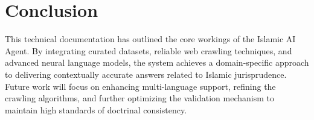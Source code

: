 \documentclass[12pt,a4paper]{article}
\begin{document}
\section{Conclusion}
This technical documentation has outlined the core workings of the Islamic AI Agent. By integrating curated datasets, reliable web crawling techniques, and advanced neural language models, the system achieves a domain-specific approach to delivering contextually accurate answers related to Islamic jurisprudence. Future work will focus on enhancing multi-language support, refining the crawling algorithms, and further optimizing the validation mechanism to maintain high standards of doctrinal consistency.
\end{document}
